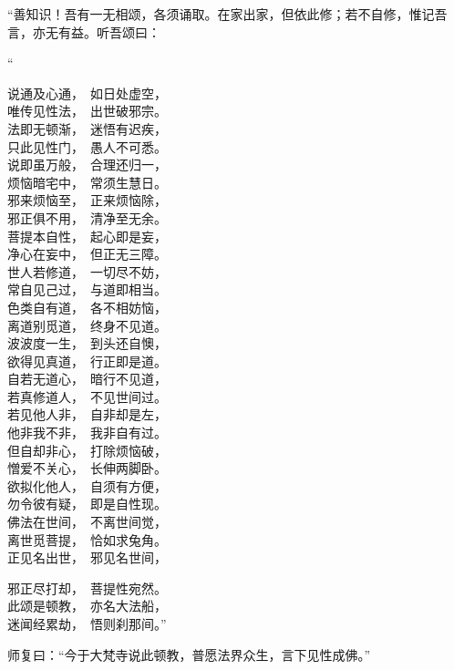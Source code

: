\documentclass[UTF8, 11pt, oneside]{ctexart}
\newenvironment{jizi}[1]{
    \vspace{-1em}\begin{center}
        #1%
        \begin{varwidth}[t]{\linewidth}
}{
        \end{varwidth}
    \end{center}
}
\begin{document}
“善知识！吾有一无相颂，各须诵取。在家出家，但依此修；若不自修，惟记吾言，亦无有益。听吾颂曰：

\begin{jizi}{“}
    说通及心通，　如日处虚空， \\
    唯传见性法，　出世破邪宗。 \\
    法即无顿渐，　迷悟有迟疾， \\
    只此见性门，　愚人不可悉。 \\
    说即虽万般，　合理还归一， \\
    烦恼暗宅中，　常须生慧日。 \\
    邪来烦恼至，　正来烦恼除， \\
    邪正俱不用，　清净至无余。 \\
    菩提本自性，　起心即是妄， \\
    净心在妄中，　但正无三障。 \\
    世人若修道，　一切尽不妨， \\
    常自见己过，　与道即相当。 \\
    色类自有道，　各不相妨恼， \\
    离道别觅道，　终身不见道。 \\
    波波度一生，　到头还自懊， \\
    欲得见真道，　行正即是道。 \\
    自若无道心，　暗行不见道， \\
    若真修道人，　不见世间过。 \\
    若见他人非，　自非却是左， \\
    他非我不非，　我非自有过。 \\
    但自却非心，　打除烦恼破， \\
    憎爱不关心，　长伸两脚卧。 \\
    欲拟化他人，　自须有方便， \\
    勿令彼有疑，　即是自性现。 \\
    佛法在世间，　不离世间觉， \\
    离世觅菩提，　恰如求兔角。 \\
    正见名出世，　邪见名世间， %
\end{jizi}
\begin{jizi}{}
    邪正尽打却，　菩提性宛然。 \\
    此颂是顿教，　亦名大法船， \\
    迷闻经累劫，　悟则刹那间。”
\end{jizi}

师复曰：“今于大梵寺说此顿教，普愿法界众生，言下见性成佛。”
\end{document}
